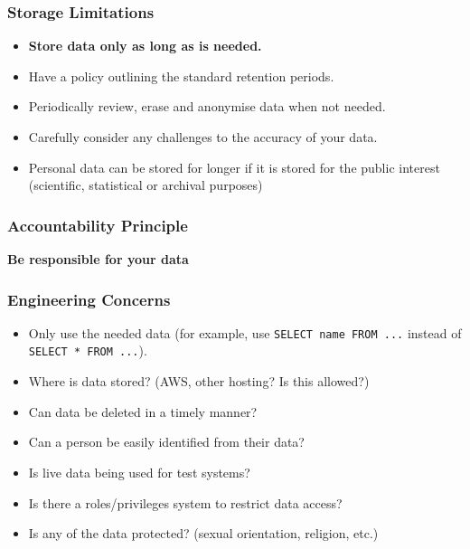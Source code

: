 \subsubsection{Storage Limitations}\label{ssub:storage_limitations}

\begin{itemize}
    \item \textbf{Store data only as long as is needed.}
    \item Have a policy outlining the standard retention periods.
    \item Periodically review, erase and anonymise data when not needed.
    \item Carefully consider any challenges to the accuracy of your data.
    \item Personal data can be stored for longer if it is stored for the public interest (scientific, statistical or archival purposes)
\end{itemize}

\subsubsection{Accountability Principle}\label{ssub:accountability_principle}

\textbf{Be responsible for your data}

\subsubsection{Engineering Concerns}\label{ssub:engineering_concerns}
\begin{itemize}
    \item Only use the needed data (for example, use \texttt{SELECT name FROM ...} instead of \texttt{SELECT * FROM ...}).
    \item Where is data stored? (AWS, other hosting? Is this allowed?)
    \item Can data be deleted in a timely manner?
    \item Can a person be easily identified from their data?
    \item Is live data being used for test systems?
    \item Is there a roles/privileges system to restrict data access?
    \item Is any of the data protected? (sexual orientation, religion, etc.)
\end{itemize}

